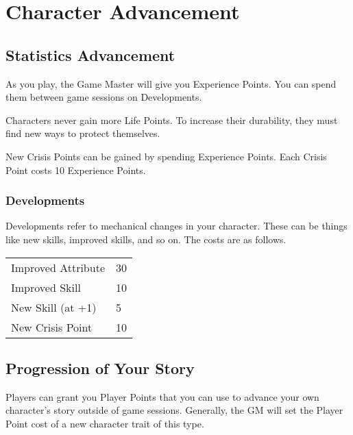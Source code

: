 \chapter{Character Advancement}

\begin{multicols}{2}

\section{Statistics Advancement}

As you play, the Game Master will give you Experience Points. You 
can spend them between game sessions on Developments.

Characters never gain more Life Points. To increase their durability, 
they must find new ways to protect themselves.

New Crisis Points can be gained by spending Experience Points. Each 
Crisis Point costs 10 Experience Points.

\subsection{Developments}

Developments refer to mechanical changes in your character. These can
be things like new skills, improved skills, and so on. The costs are
as follows.

\begin{center}
{
\begin{xtabular}{|l|l|}
Improved Attribute & 30 \\
Improved Skill & 10 \\
New Skill (at +1) & 5 \\
New Crisis Point & 10 \\
\hline
\end{xtabular}
}
\end{center}

\section{Progression of Your Story}

Players can grant you Player Points that you can use to advance your own 
character's story outside of game sessions. Generally, the GM will set the
Player Point cost of a new character trait of this type.

\end{multicols}
